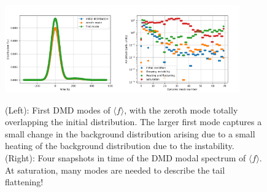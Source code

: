 \documentclass{article}
\begin{document}
\begin{figure}[h]
  \centering
  \includegraphics[width=0.45\textwidth]{avgf/avg_f_koopman_modes}\includegraphics[width=0.45\textwidth]{avgf/avg_f_modal_amplitudes}
  \caption{(Left): First DMD modes of $\langle f\rangle$, with the zeroth mode totally overlapping the initial distribution. The larger first mode captures a small change in the background distribution arising due to a small heating of the background distribution due to the instability. (Right): Four snapshots in time of the DMD modal spectrum of $\langle f\rangle$. At saturation, many modes are needed to describe the tail flattening!}
\end{figure}
\end{document}
